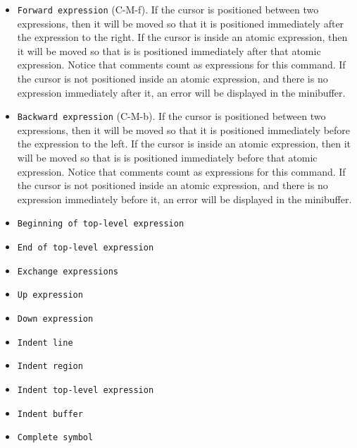 \begin{itemize}
\item \texttt{Forward expression} (C-M-f).  If the cursor is
  positioned between two expressions, then it will be moved so that it
  is positioned immediately after the expression to the right.  If the
  cursor is inside an atomic expression, then it will be moved so that
  is is positioned immediately after that atomic expression.  Notice
  that comments count as expressions for this command.  If the cursor
  is not positioned inside an atomic expression, and there is no
  expression immediately after it, an error will be displayed in the
  minibuffer.
\item \texttt{Backward expression} (C-M-b).  If the cursor is
  positioned between two expressions, then it will be moved so that it
  is positioned immediately before the expression to the left.  If the
  cursor is inside an atomic expression, then it will be moved so that
  is is positioned immediately before that atomic expression.  Notice
  that comments count as expressions for this command.  If the cursor
  is not positioned inside an atomic expression, and there is no
  expression immediately before it, an error will be displayed in the
  minibuffer.
\item \texttt{Beginning of top-level expression}
\item \texttt{End of top-level expression}
\item \texttt{Exchange expressions}
\item \texttt{Up expression}
\item \texttt{Down expression}
\item \texttt{Indent line}
\item \texttt{Indent region}
\item \texttt{Indent top-level expression}
\item \texttt{Indent buffer}
\item \texttt{Complete symbol}
\end{itemize}


